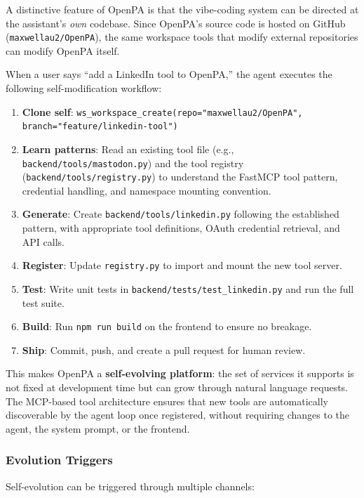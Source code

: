 A distinctive feature of OpenPA is that the vibe-coding system can be directed at the assistant's \textit{own} codebase. Since OpenPA's source code is hosted on GitHub (\texttt{maxwellau2/OpenPA}), the same workspace tools that modify external repositories can modify OpenPA itself.

When a user says ``add a LinkedIn tool to OpenPA,'' the agent executes the following self-modification workflow:

\begin{enumerate}[leftmargin=*]
  \item \textbf{Clone self}: \texttt{ws\_workspace\_create(repo="maxwellau2/OpenPA", branch="feature/linkedin-tool")}
  \item \textbf{Learn patterns}: Read an existing tool file (e.g., \texttt{backend/tools/mastodon.py}) and the tool registry (\texttt{backend/tools/registry.py}) to understand the FastMCP tool pattern, credential handling, and namespace mounting convention.
  \item \textbf{Generate}: Create \texttt{backend/tools/linkedin.py} following the established pattern, with appropriate tool definitions, OAuth credential retrieval, and API calls.
  \item \textbf{Register}: Update \texttt{registry.py} to import and mount the new tool server.
  \item \textbf{Test}: Write unit tests in \texttt{backend/tests/test\_linkedin.py} and run the full test suite.
  \item \textbf{Build}: Run \texttt{npm run build} on the frontend to ensure no breakage.
  \item \textbf{Ship}: Commit, push, and create a pull request for human review.
\end{enumerate}

This makes OpenPA a \textbf{self-evolving platform}: the set of services it supports is not fixed at development time but can grow through natural language requests. The MCP-based tool architecture ensures that new tools are automatically discoverable by the agent loop once registered, without requiring changes to the agent, the system prompt, or the frontend.

\subsubsection{Evolution Triggers}

Self-evolution can be triggered through multiple channels:

